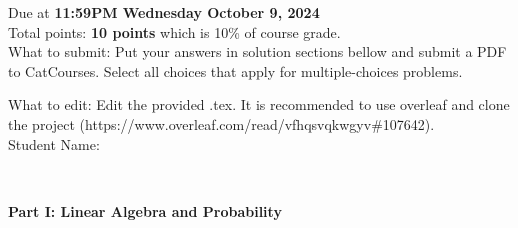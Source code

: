 \documentclass[addpoints,12pt]{exam}
\begin{document}
\noindent Due at \textbf{11:59PM Wednesday October 9, 2024} \\
Total points: \textbf{10 points} which is 10\% of course grade.
\\
\noindent What to submit: Put your answers in solution sections bellow and submit a PDF to CatCourses. Select all choices that apply for multiple-choices problems.

\noindent What to edit: Edit the provided .tex. It is recommended to use overleaf and clone the project (https://www.overleaf.com/read/vfhqsvqkwgyv\#107642).\\

\noindent Student Name:
\runningheadrule
{}

\begin{center}
\makebox[\textwidth]{\enspace\hrulefill}\\ 
\end{center}

\noindent\textbf{{\large Part I: Linear Algebra and Probability}}
\end{document}
